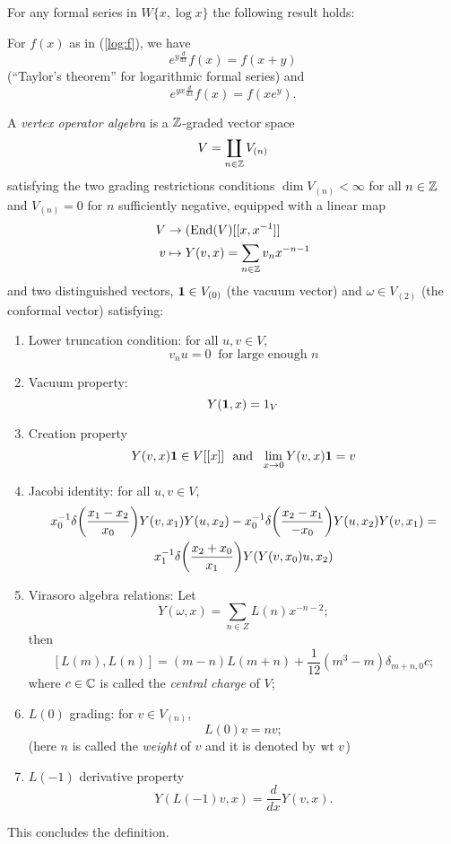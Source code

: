 \documentclass[12pt]{article}
\begin{document}
For any formal series in $W\{x, \log x\}$ the following result holds:
\begin{thm}\label{log:ids}
For $f(x)$ as in (\ref{log:f}), we have
\begin{equation}\label{log:ck1}
e^{y\frac d{dx}}f(x)=f(x+y)
\end{equation}
(``Taylor's theorem'' for logarithmic formal series) and
\begin{equation}\label{log:ck2}
e^{yx\frac d{dx}}f(x)=f(xe^y).
\end{equation}
\end{thm}

\begin{defn}{\rm
  A \emph{vertex operator algebra} is a $\mathbb{Z}$-graded vector space
  $$V = \coprod_{n\in \mathbb{Z}} V_{(n)}$$ satisfying the two grading restrictions
  conditions $\dim V_{(n)} < \infty$ for all $n \in \mathbb{Z}$ and $V_{(n)} = 0$ for
  $n$ sufficiently negative, equipped with a linear map
  \begin{align}
    V & \rightarrow (\mathrm{End}(V)[[x,x^{-1}]] \nonumber \\
    v & \mapsto Y(v, x) = \sum_{n\in \mathbb{Z}} v_n x^{-n-1}
  \end{align}
  and two distinguished vectors, $\mathbf{1} \in V_{(0)}$ (the vacuum vector)
  and $\omega \in V_{(2)}$ (the conformal vector) satisfying:

  \begin{enumerate}
    \item Lower truncation condition: for all $u, v\in V$,
      $$v_nu = 0 \ \text{ for large enough }n $$
    \item Vacuum property:
      $$
        Y(\mathbf{1}, x) = 1_V
      $$
    \item Creation property
      $$
        Y(v, x)\mathbf{1} \in V[[x]]\ \text{ and }\ \lim_{x\rightarrow 0} Y(v,x)\mathbf{1} = v
      $$
    \item Jacobi identity: for all $u,v\in V$,
      \begin{gather*}
         x_0 ^{-1}\delta \bigg( \frac{x_1 - x_2 }{x_0 }\bigg)Y(v,x_1)Y(u,x_2)  -x_0 ^{-1}\delta \bigg( \frac{x_2 -x_1 }{-x_0 }\bigg)Y(u,x_2)Y(v,x_1) = \\
         x_1 ^{-1}\delta \bigg( \frac{x_2 +x_0 }{x_1 }\bigg) Y(Y(v, x_0)u, x_2)
       \end{gather*}
    \item Virasoro algebra relations: Let
      $$
        Y(\omega, x) = \sum_{n\in Z} L(n)x^{-n-2};
      $$
      then 
      $$
      [L(m), L(n)] = (m-n)L(m+n) +\frac{1}{12}(m^3 - m)\delta_{m+n,0}c;
      $$
      where $c\in\mathbb{C}$ is called the \emph{central charge} of $V$;
    \item $L(0)$ grading: for $v\in V_{(n)}$,
      $$
        L(0)v = nv;
      $$
      (here $n$ is called the \emph{weight} of $v$ and it is denoted by $\mbox{\rm wt}\  v$)
    \item $L(-1)$ derivative property
      $$
        Y(L(-1)v, x) = \frac{d}{dx} Y(v,x).
      $$
  \end{enumerate}
This concludes the definition.
}
\end{defn}
\end{document}
